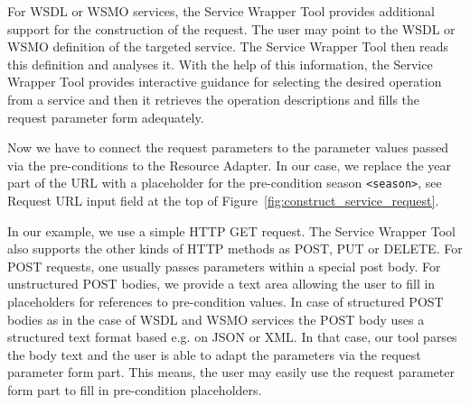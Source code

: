 \documentclass{fast_latex}
\begin{document}
For WSDL or WSMO services, the Service Wrapper Tool provides additional support for the construction of the request. The user may point to the WSDL or WSMO definition of the targeted service. The Service Wrapper Tool then reads this definition and analyses it. With the help of this information, the Service Wrapper Tool provides interactive guidance for selecting the desired operation from a service and then it retrieves the operation descriptions and fills the request parameter form adequately.

Now we have to connect the request parameters to the parameter values passed via the pre-conditions to the Resource Adapter. In our case, we replace the year part of the URL with a placeholder for the pre-condition season \verb|<season>|, see Request URL input field at the top of Figure~\ref{fig:construct_service_request}.  

In our example, we use a simple HTTP GET request. The Service Wrapper Tool also supports the other kinds of HTTP methods as POST, PUT or DELETE. For POST requests, one usually passes parameters within a special post body. For unstructured POST bodies, we provide a text area allowing the user to fill in placeholders for references to pre-condition values. In case of structured POST bodies as in the case of WSDL and WSMO services the POST body uses a structured text format based e.g. on JSON or XML. In that case, our tool parses the body text and the user is able to adapt the parameters via the request parameter form part. This means, the user may easily use the request parameter form part to fill in pre-condition placeholders.
\end{document}
